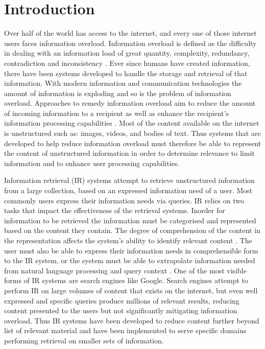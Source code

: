 \chapter{Introduction}
\label{chp:1}
\justify
Over half of the world has access to the internet, and every one of those internet users faces information overload. Information overload is defined as the difficulty in dealing with an information load of great quantity, complexity, redundancy, contradiction and inconsistency \citep{gross1964managing,roetzel2019information}. Ever since humans have created information, there have been systems developed to handle the storage and retrieval of that information. With modern information and communication technologies the amount of information is exploding and so is the problem of information overload. Approaches to remedy information overload aim to reduce  the amount of incoming information to a recipient as well as enhance the recipient’s information processing capabilities \citep{soucek2010coping}. Most of the content available on the internet is unstructured such as: images, videos, and bodies of text. Thus systems that are developed to help reduce information overload must therefore be able to represent the content of unstructured information in order to determine relevance to limit information and to enhance user processing capabilities.

Information retrieval (IR) systems attempt to retrieve unstructured information from a large collection, based on an expressed information need of a user. Most commonly users express their information needs via queries. IR relies on two tasks that impact the effectiveness of the retrieval systems. Inorder for information to be retrieved the information must be categorised and represented based on the content they contain. The degree of comprehension of the content in the representation affects the system's ability to identify relevant content \citep{chiaramella2000information}. The user must also be able to express their information needs in comprehensible form to the IR system, or the system must be able to extrapolate information needed from natural language processing and query context \citep{carpineto2012survey}. One of the most visible forms of IR systems are search engines like Google. Search engines attempt to perform IR on large volumes of content that exists on the internet, but even well expressed and specific queries produce millions of relevant results, reducing content presented to the users but not significantly mitigating information overload. Thus IR systems have been developed to reduce content further beyond list of relevant material and have been implemented to serve specific domains performing retrieval on smaller sets of information. 

